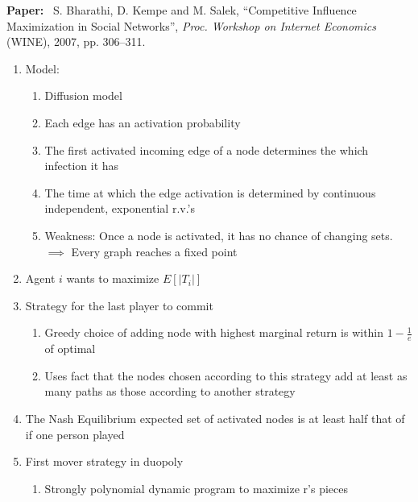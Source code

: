 \documentclass[11pt]{article}
\begin{document}
\noindent
\textbf{Paper:}~
S. Bharathi, D. Kempe and M. Salek, ``Competitive Influence
Maximization in Social Networks”, \emph{Proc. Workshop on Internet Economics}
(WINE), 2007, pp. 306--311.

\medskip

\begin{enumerate}
    \item Model:
    \begin{enumerate}
        \item Diffusion model
        
        \item Each edge has an activation probability
        
        \item The first activated incoming edge of a node determines the which infection it has
        
        \item The time at which the edge activation is determined by continuous independent, exponential r.v.'s
        
        \item Weakness: Once a node is activated, it has no chance of changing sets.$\implies$ Every graph reaches a fixed point
    \end{enumerate}
    \item Agent $i$ wants to maximize $E[|T_{i}|]$
    \item Strategy for the last player to commit
    \begin{enumerate}
    
        \item Greedy choice of adding node with highest 
        marginal return is within $1-\frac{1}{e}$ of optimal
        
        \item Uses fact that the nodes chosen according to this strategy add at least as many paths as those according to another strategy
        
    \end{enumerate}
    
    \item The Nash Equilibrium expected set of activated nodes is at least half that of if one person played
    
    \item First mover strategy in duopoly
    \begin{enumerate}
        \item Strongly polynomial dynamic program to maximize r's pieces
    \end{enumerate}
    

\end{enumerate}
\end{document}
